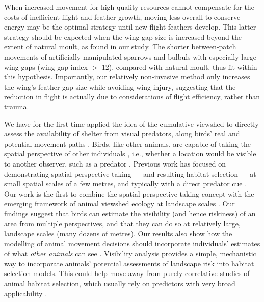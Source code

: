 When increased movement for high quality resources \parencite{charnov1976} cannot compensate for the costs of inefficient flight and feather growth, moving less overall to conserve energy may be the optimal strategy until new flight feathers develop.
This latter strategy should be expected when the wing gap size is increased beyond the extent of natural moult, as found in our study.
The shorter between-patch movements of artificially manipulated sparrows and bulbuls with especially large wing gaps (wing gap index $>$ 12), compared with natural moult, thus fit within this hypothesis.
Importantly, our relatively non-invasive method only increases the wing's feather gap size while avoiding wing injury, suggesting that the reduction in flight is actually due to considerations of flight efficiency, rather than trauma.

We have for the first time applied the idea of the cumulative viewshed to directly assess the availability of shelter from visual predators, along birds' real and potential movement paths \parencite{olsoy2015}.
Birds, like other animals, are capable of taking the spatial perspective of other individuals \parencite{emery2000,krams2001,watve2002,davidson2016}, i.e., whether a location would be visible to another observer, such as a predator \citep{watve2002,olsoy2015}.
Previous work has focused on demonstrating spatial perspective taking --- and resulting habitat selection --- at small spatial scales of a few metres, and typically with a direct predator cue \parencite{krams2001,watve2002}.
Our work is the first to combine the spatial perspective-taking concept with the emerging framework of animal viewshed ecology at landscape scales \parencite{aben2018,aben2021}.
Our findings suggest that birds can estimate the visibility (and hence riskiness) of an area from multiple perspectives, and that they can do so at relatively large, landscape scales (many dozens of metres).
Our results also show how the modelling of animal movement decisions should incorporate individuals' estimates of what \textit{other animals} can see \parencite{hampton1994,emery2000}.
Visibility analysis provides a simple, mechanistic way to incorporate animals' potential assessments of landscape risk into habitat selection models.
This could help move away from purely correlative studies of animal habitat selection, which usually rely on predictors with very broad applicability \parencite{pettorelli2011}.

